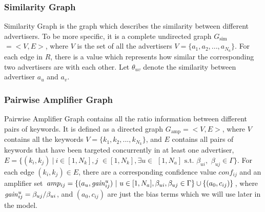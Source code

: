 \documentclass[conference,compsoc]{IEEEtran}
\begin{document}
\subsubsection{Similarity Graph}
\label{sec:simi_graph}
Similarity Graph is the graph which describes the similarity between different advertisers. To be more specific, it is a complete undirected graph $G_{\mbox{sim}}$ $=<V,E>$, where $V$ is the set of all the advertisers $V=\{a_1,a_2,...,a_{N_a}\}$. For each edge in $R$, there is a value which represents how similar the corresponding two advertisers are with each other. Let $\theta_{uv}$
denote the similarity between advertiser $a_u$ and
$a_v$.

\subsubsection{Pairwise Amplifier Graph}
\label{sec:pag}
Pairwise Amplifier Graph  contains all the ratio information between different pairs of keywords. It is defined as a directed graph
$G_{\mbox{amp}}=<V,E>$, where $V$ contains all the keywords $V=\{k_1,k_2,...,k_{N_k}\}$, and $E$ contains all pairs of keywords that have been targeted concurrently in at least one advertiser, $E=\{(k_i,k_j)~|~i\in [1,N_k],j$ $\in [1,N_k],\exists u\in $ $ [1,N_a]\mbox{ s.t. }\beta_{ui},$ $\beta_{uj}\in \Gamma\}$. For each edge
$(k_i,k_j)\in E$, there are a corresponding confidence value $conf_{ij}$ and an amplifier set $amp_{ij}=\{(a_u,\mathit{gain}^{u}_{ij})~|~u\in [1,N_a],\beta_{ui},\beta_{uj}\in \Gamma\} \cup \{(a_0,c_{ij})\}$, where $\mathit{gain}^{u}_{ij}=\beta_{uj}/\beta_{ui}$, and $(a_0,c_{ij})$ are just
the bias terms which we will use later in the
model.
\end{document}
